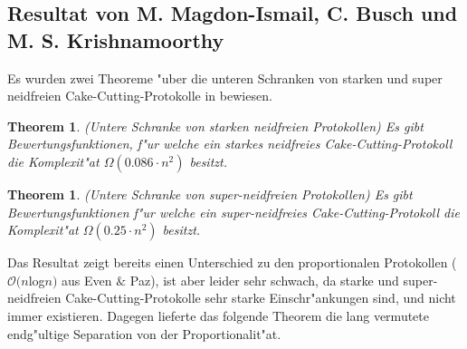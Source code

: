 \documentclass[11pt, a4paper, twoside]{article}
\newtheorem{thm}[satz]{Theorem}
\numberwithin{equation}{section}
\begin{document}
\subsection{Resultat von M. Magdon-Ismail, C. Busch und\\M. S. Krishnamoorthy}
Es wurden zwei Theoreme "uber die unteren Schranken von starken und super neidfreien Cake-Cutting-Protokolle in \cite{6} bewiesen.
\begin{thm}(Untere Schranke von starken neidfreien Protokollen)
\newline Es gibt Bewertungsfunktionen, f"ur welche ein starkes neidfreies Cake-Cutting-Protokoll die Komplexit"at $\Omega(0.086\cdot n^2)$ besitzt.
\end{thm}
\begin{thm}(Untere Schranke von super-neidfreien Protokollen)
\newline Es gibt Bewertungsfunktionen f"ur welche ein super-neidfreies Cake-Cutting-Protokoll die Komplexit"at $\Omega(0.25\cdot n^2)$ besitzt.
\end{thm}
Das Resultat zeigt bereits einen Unterschied zu den proportionalen Protokollen ($\mathcal O(n$log$ n)$ aus Even $\&$ Paz), ist aber leider sehr schwach, da starke und super-neidfreien Cake-Cutting-Protokolle sehr starke Einschr"ankungen sind, und nicht immer existieren. Dagegen lieferte das folgende Theorem die lang vermutete endg"ultige Separation von der Proportionalit"at.\\
\newline
\end{document}
